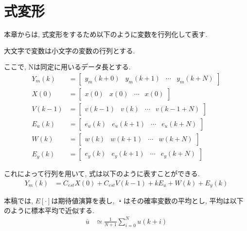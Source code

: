 \documentclass[a4paper,12pt]{jbook}
\begin{document}
\section{式変形} \label{sec:henkei}

本章からは, 式変形をするため以下のように変数を行列化して表す.

大文字で変数は小文字の変数の行列とする.

ここで, Nは同定に用いるデータ長とする.\\
\begin{align}
Y_m(k) &= \begin{bmatrix} y_m(k+0) & y_m(k+1) & \cdots & y_m(k+N) \end{bmatrix}  \label{eqn:vecym} \\
X(0) &= \begin{bmatrix} x(0) & x(0) & \cdots & x(0) \end{bmatrix}  \label{eqn:vecx0} \\
V(k-1) &= \begin{bmatrix} v(k-1) & v(k) & \cdots & v(k-1+N) \end{bmatrix}  \label{eqn:vecv}\\
E_u(k) & = \begin{bmatrix} e_u(k) & e_u(k+1) & \cdots & e_u(k+N) \end{bmatrix}  \label{eqn:veceu}\\
W(k) & = \begin{bmatrix} w(k) & w(k+1) & \cdots & w(k+N) \end{bmatrix}  \label{eqn:vecw}\\
E_y(k) & = \begin{bmatrix} e_y(k) & e_y(k+1) & \cdots & e_y(k+N) \end{bmatrix}  \label{eqn:vecey}
\end{align}

これによって行列を用いて, 式は以下のように表すことができる.\\
\begin{align}
Y_m(k) &= C_{est} X(0) + C_{est} V(k-1) + kE_u + W(k) + E_y(k) \label{eqn:vecym}
\end{align}

本稿では, $E[ \cdot ]$は期待値演算を表し, $\overline{・}$はその確率変数の平均とし, 平均は以下のように標本平均で近似する.
\begin{align}
\overline{u} &\simeq \frac{1}{N+1} \sum_{i=0}^N u(k+i)
\end{align}
\end{document}
